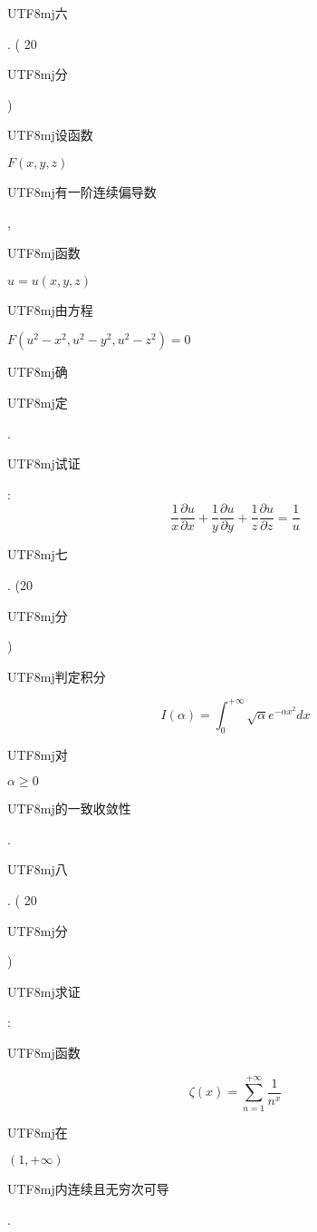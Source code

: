 \documentclass[10pt]{article}
\begin{document}
\begin{CJK}{UTF8}{mj}六\end{CJK}. ( 20 \begin{CJK}{UTF8}{mj}分\end{CJK}) \begin{CJK}{UTF8}{mj}设函数\end{CJK} $F(x, y, z)$ \begin{CJK}{UTF8}{mj}有一阶连续偏导数\end{CJK}, \begin{CJK}{UTF8}{mj}函数\end{CJK} $u=u(x, y, z)$ \begin{CJK}{UTF8}{mj}由方程\end{CJK} $F\left(u^{2}-x^{2}, u^{2}-y^{2}, u^{2}-z^{2}\right)=0$ \begin{CJK}{UTF8}{mj}确\end{CJK} \begin{CJK}{UTF8}{mj}定\end{CJK}. \begin{CJK}{UTF8}{mj}试证\end{CJK}:
$$
\frac{1}{x} \frac{\partial u}{\partial x}+\frac{1}{y} \frac{\partial u}{\partial y}+\frac{1}{z} \frac{\partial u}{\partial z}=\frac{1}{u}
$$
\begin{CJK}{UTF8}{mj}七\end{CJK}. (20 \begin{CJK}{UTF8}{mj}分\end{CJK}) \begin{CJK}{UTF8}{mj}判定积分\end{CJK}
$$
I(\alpha)=\int_{0}^{+\infty} \sqrt{\alpha} e^{-\alpha x^{2}} d x
$$
\begin{CJK}{UTF8}{mj}对\end{CJK} $\alpha \geqslant 0$ \begin{CJK}{UTF8}{mj}的一致收敛性\end{CJK}.

\begin{CJK}{UTF8}{mj}八\end{CJK}. ( 20 \begin{CJK}{UTF8}{mj}分\end{CJK}) \begin{CJK}{UTF8}{mj}求证\end{CJK}:\begin{CJK}{UTF8}{mj}函数\end{CJK}
$$
\zeta(x)=\sum_{n=1}^{+\infty} \frac{1}{n^{x}}
$$
\begin{CJK}{UTF8}{mj}在\end{CJK} $(1,+\infty)$ \begin{CJK}{UTF8}{mj}内连续且无穷次可导\end{CJK}.
\end{document}
